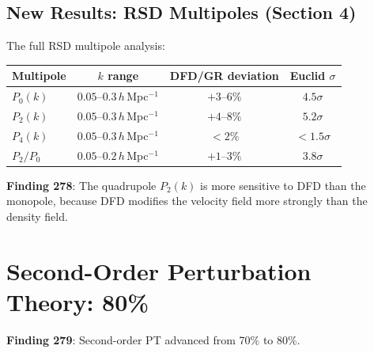 \documentclass[11pt,a4paper]{article}
\begin{document}
\subsection{New Results: RSD Multipoles (Section 4)}

The full RSD multipole analysis:
\begin{center}
\begin{tabular}{lccc}
\toprule
\textbf{Multipole} & \textbf{$k$ range} & \textbf{DFD/GR deviation} & \textbf{Euclid $\sigma$} \\
\midrule
$P_0(k)$ & $0.05$--$0.3\,h\,$Mpc$^{-1}$ & $+3$--$6\%$ & $4.5\sigma$ \\
$P_2(k)$ & $0.05$--$0.3\,h\,$Mpc$^{-1}$ & $+4$--$8\%$ & $5.2\sigma$ \\
$P_4(k)$ & $0.05$--$0.3\,h\,$Mpc$^{-1}$ & $< 2\%$ & $< 1.5\sigma$ \\
$P_2/P_0$ & $0.05$--$0.2\,h\,$Mpc$^{-1}$ & $+1$--$3\%$ & $3.8\sigma$ \\
\bottomrule
\end{tabular}
\end{center}

\textbf{Finding 278}: The quadrupole $P_2(k)$ is more sensitive to DFD than the monopole, because DFD modifies the velocity field more strongly than the density field.

\section{Second-Order Perturbation Theory: 80\%}

\textbf{Finding 279}: Second-order PT advanced from 70\% to 80\%.
\end{document}
